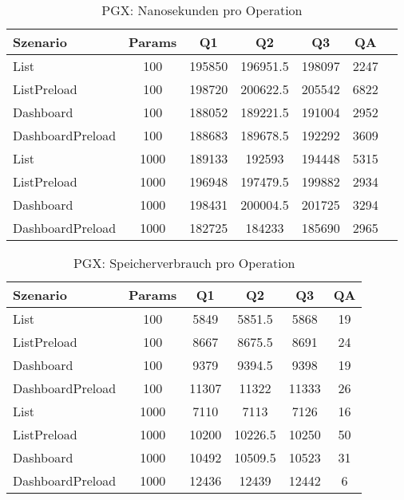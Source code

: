 
\begin{table}[ht]
\centering
\caption{PGX: Nanosekunden pro Operation}
\begin{tabular}{lcccccc}
\toprule
Szenario & Params & Q1 & Q2 & Q3 & QA \\
\midrule
	List & 100 & 195850 & 196951.5 & 198097 & 2247 \\
	ListPreload & 100 & 198720 & 200622.5 & 205542 & 6822 \\
	Dashboard & 100 & 188052 & 189221.5 & 191004 & 2952 \\
	DashboardPreload & 100 & 188683 & 189678.5 & 192292 & 3609 \\
	List & 1000 & 189133 & 192593 & 194448 & 5315 \\
	ListPreload & 1000 & 196948 & 197479.5 & 199882 & 2934 \\
	Dashboard & 1000 & 198431 & 200004.5 & 201725 & 3294 \\
	DashboardPreload & 1000 & 182725 & 184233 & 185690 & 2965 \\
\bottomrule
\end{tabular}
\label{tab:benchmark_pgx_nsperop}
\end{table}
	
\begin{table}[ht]
\centering
\caption{PGX: Speicherverbrauch pro Operation}
\begin{tabular}{lccccc}
\toprule
Szenario & Params & Q1 & Q2 & Q3 & QA \\
\midrule
	List & 100 & 5849 & 5851.5 & 5868 & 19 \\
	ListPreload & 100 & 8667 & 8675.5 & 8691 & 24 \\
	Dashboard & 100 & 9379 & 9394.5 & 9398 & 19 \\
	DashboardPreload & 100 & 11307 & 11322 & 11333 & 26 \\
	List & 1000 & 7110 & 7113 & 7126 & 16 \\
	ListPreload & 1000 & 10200 & 10226.5 & 10250 & 50 \\
	Dashboard & 1000 & 10492 & 10509.5 & 10523 & 31 \\
	DashboardPreload & 1000 & 12436 & 12439 & 12442 & 6 \\
\bottomrule
\end{tabular}
\label{tab:benchmark_pgx_bytesperop}
\end{table}
	
